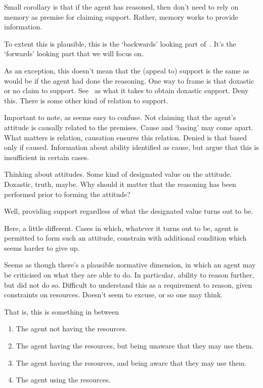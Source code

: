 \begin{note}
  Small corollary is that if the agent has reasoned, then don't need to rely on memory as premise for claiming support.
  Rather, memory works to provide information.

  To extent this is plausible, this is the `backwards' looking part of~\rC{}.
  It's the `forwards' looking part that we will focus on.
\end{note}

\begin{note}
  As an exception, this doesn't mean that the (appeal to) support is the same as would be if the agent had done the reasoning.
  One way to frame is that doxastic or no claim to support.
  See~\uRa{} as what it takes to obtain doxastic support.
  Deny this.
  There is some other kind of relation to support.
\end{note}

\begin{note}[No causality]
  Important to note, as seems easy to confuse.
  Not claiming that the agent's attitude is causally related to the premises.
  Cause and `basing' may come apart.
  What matters is relation, causation ensures this relation.
  Denied is that based only if caused.
  Information about ability identified as cause, but argue that this is insufficient in certain cases.
\end{note}

\begin{note}
  Thinking about attitudes.
  Some kind of designated value on the attitude.
  Doxastic, truth, maybe.
  Why should it matter that the reasoning has been performed prior to forming the attitude?

  Well, providing support regardless of what the designated value turns out to be.
  

  Here, a little different.
  Cases in which, whatever it turns out to be, agent is permitted to form such an attitude, constrain with additional condition which seems harder to give up.
\end{note}

\begin{note}
  Seems as though there's a plausible normative dimension, in which an agent may be criticised on what they are able to do.
  In particular, ability to reason further, but did not do so.
  Difficult to understand this as a requirement to reason, given constraints on resources.
  Doesn't seem to excuse, or so one may think.

  That is, this is something in between
  \begin{enumerate}
  \item The agent not having the resources.
  \item The agent having the resources, but being unaware that they may use them.
  \item The agent having the resources, and being aware that they may use them.
  \item The agent using the resources.
  \end{enumerate}
\end{note}

